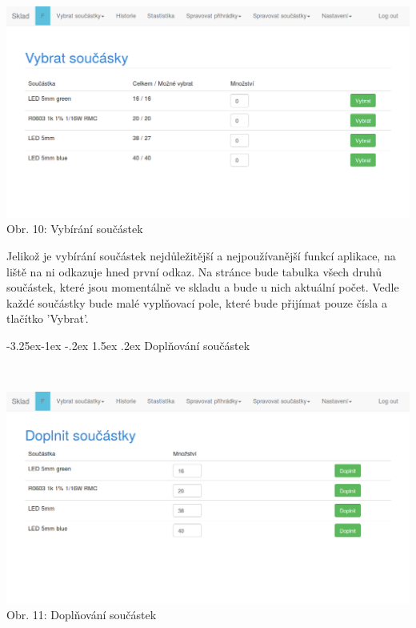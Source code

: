 \documentclass[12pt, a4paper, oneside]{article}
\makeatletter
\renewcommand\paragraph{\@startsection{paragraph}{4}{\z@}%
      {-3.25ex\@plus -1ex \@minus -.2ex}%
      {1.5ex \@plus .2ex}%
      {\normalfont\normalsize\bfseries}}
\makeatother
\begin{document}
\\
\begin{minipage}{\textwidth}
\begin{center}
\includegraphics[scale=0.5]{img/web_vybrat_soucastky.png}
\\
\caption{Obr. 10: Vybírání součástek}
\end{center}
\end{minipage}
\vspace{4mm}

Jelikož je vybírání součástek nejdůležitější a nejpoužívanější funkcí aplikace, na liště na ni odkazuje hned první odkaz.
Na stránce bude tabulka všech druhů součástek, které jsou momentálně ve skladu a bude u nich aktuální počet. Vedle každé součástky bude malé vyplňovací pole, které bude přijímat pouze čísla
a tlačítko 'Vybrat'.

\paragraph{Doplňování součástek}

\\
\begin{minipage}{\textwidth}
\begin{center}
\includegraphics[scale=0.5]{img/web_doplnit_soucastky.png}
\\
\caption{Obr. 11: Doplňování součástek}
\end{center}
\end{minipage}
\vspace{4mm}
\end{document}
